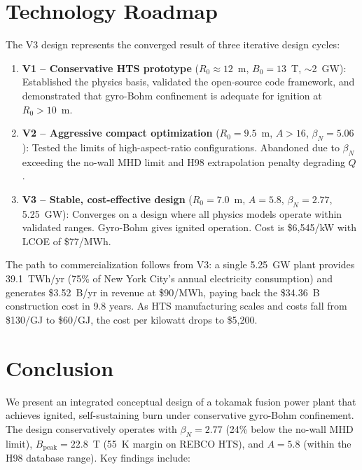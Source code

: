 \documentclass[11pt,a4paper]{article}
\begin{document}
\section{Technology Roadmap}

The V3 design represents the converged result of three iterative design cycles:

\begin{enumerate}[nosep]
    \item \textbf{V1 -- Conservative HTS prototype} ($R_0 \approx 12$~m, $B_0 = 13$~T, $\sim$2~GW): Established the physics basis, validated the open-source code framework, and demonstrated that gyro-Bohm confinement is adequate for ignition at $R_0 > 10$~m.
    \item \textbf{V2 -- Aggressive compact optimization} ($R_0 = 9.5$~m, $A > 16$, $\beta_N = 5.06$): Tested the limits of high-aspect-ratio configurations. Abandoned due to $\beta_N$ exceeding the no-wall MHD limit and H98 extrapolation penalty degrading $Q$.
    \item \textbf{V3 -- Stable, cost-effective design} ($R_0 = 7.0$~m, $A = 5.8$, $\beta_N = 2.77$, 5.25~GW): Converges on a design where all physics models operate within validated ranges. Gyro-Bohm gives ignited operation. Cost is \$6,545/kW with LCOE of \$77/MWh.
\end{enumerate}

The path to commercialization follows from V3: a single 5.25~GW plant provides 39.1~TWh/yr (75\% of New York City's annual electricity consumption) and generates \$3.52~B/yr in revenue at \$90/MWh, paying back the \$34.36~B construction cost in 9.8 years. As HTS manufacturing scales and costs fall from \$130/GJ to \$60/GJ, the cost per kilowatt drops to \$5,200.

\section{Conclusion}

We present an integrated conceptual design of a tokamak fusion power plant that achieves ignited, self-sustaining burn under conservative gyro-Bohm confinement. The design conservatively operates with $\beta_N = 2.77$ (24\% below the no-wall MHD limit), $B_{\text{peak}} = 22.8$~T (55~K margin on REBCO HTS), and $A = 5.8$ (within the H98 database range). Key findings include:
\end{document}
